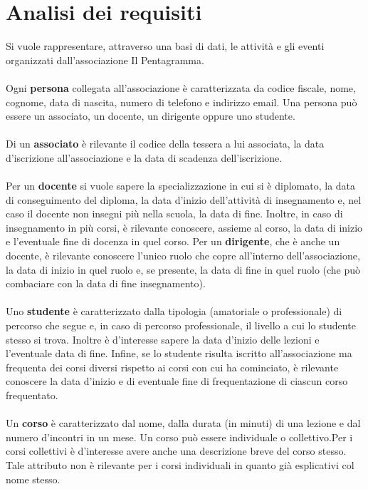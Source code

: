 \documentclass[11pt]{article}
\begin{document}
\section{Analisi dei requisiti}
	Si vuole rappresentare, attraverso una basi di dati, le attività e gli eventi organizzati dall'associazione Il Pentagramma.\\\\
	Ogni \textbf{persona} collegata all'associazione è caratterizzata da codice fiscale, nome, cognome, data di nascita, numero di telefono e indirizzo email. Una persona può essere un associato, un docente, un dirigente oppure uno studente.\\\\
	Di un \textbf{associato} è rilevante il codice della tessera a lui associata, la data d'iscrizione all'associazione e la data di scadenza dell'iscrizione.\\\\
	Per un \textbf{docente} si vuole sapere la specializzazione in cui si è diplomato, la data di conseguimento del diploma, la data d'inizio dell'attività di insegnamento e, nel caso il docente non insegni più nella scuola, la data di fine. Inoltre, in caso di insegnamento in più corsi, è rilevante conoscere, assieme al corso, la data di inizio e l'eventuale fine di docenza in quel corso. Per un \textbf{dirigente}, che è anche un docente, è rilevante conoscere l'unico ruolo che copre all'interno dell'associazione, la data di inizio in quel ruolo e, se presente, la data di fine in quel ruolo (che può combaciare con la data di fine insegnamento).\\\\
	Uno \textbf{studente} è caratterizzato dalla tipologia (amatoriale o professionale) di percorso che segue e, in caso di percorso professionale, il livello a cui lo studente stesso si trova. Inoltre è d'interesse sapere la data d'inizio delle lezioni e l'eventuale data di fine. Infine, se lo studente risulta iscritto all'associazione ma frequenta dei corsi diversi rispetto ai corsi con cui ha cominciato, è rilevante conoscere la data d'inizio e di eventuale fine di frequentazione di ciascun corso frequentato.\\\\
	Un \textbf{corso} è caratterizzato dal nome, dalla durata (in minuti) di una lezione e dal numero d'incontri in un mese. Un corso può essere individuale o collettivo.Per i corsi collettivi è d'interesse avere anche una descrizione breve del corso stesso. Tale attributo non è rilevante per i corsi individuali in quanto già esplicativi col nome stesso.\\\\
\end{document}
